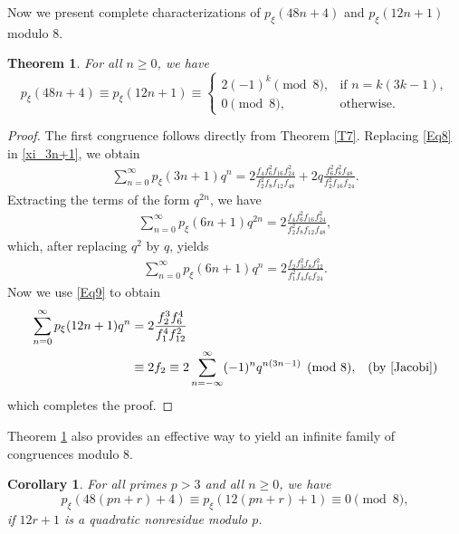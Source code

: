 \documentclass[12pt]{article}
\newtheorem{theorem}{Theorem}[section]
\newtheorem{corollary}{Corollary}[section]
\begin{document}
	Now we present complete characterizations of $p_{\xi}(48n+4)$ and $p_{\xi}(12n+1)$ modulo 8.
	
	\begin{theorem} For all $n \geq 0$, we have 
		$$p_{\xi}(48n+4) \equiv p_{\xi}(12n+1) \equiv  
		\begin{cases}
		2(-1)^k \pmod{8}, & \mbox{if $n=k(3k-1)$}, \\
		0 \pmod{8}, & \mbox{otherwise}.
		\end{cases}$$
	\label{T8}
	\end{theorem}
	
	\begin{proof}
		The first congruence follows directly from Theorem \ref{T7}. Replacing \eqref{Eq8} in \eqref{xi_3n+1}, we obtain
		\begin{align*}
		\sum_{n=0}^{\infty} p_{\xi}(3n+1)q^n = 2\displaystyle\frac{f_{4}f_{6}^2f_{16}f_{24}^{2}}{f_{2}^{2}f_{8}f_{12}f_{48}} + 2q\displaystyle\frac{f_{6}^2f_{8}^{2}f_{48}}{f_{2}^{2}f_{16}f_{24}}.
		\end{align*}
		Extracting the terms of the form $q^{2n}$, we have
		\begin{align*}
		\sum_{n=0}^{\infty} p_{\xi}(6n+1)q^{2n} = 2\displaystyle\frac{f_{4}f_{6}^2f_{16}f_{24}^{2}}{f_{2}^{2}f_{8}f_{12}f_{48}},
		\end{align*}
		which, after replacing $q^2$ by $q$, yields
		\begin{align}
		\sum_{n=0}^{\infty} p_{\xi}(6n+1)q^{n} = 2\displaystyle\frac{f_{2}f_{3}^2f_{8}f_{12}^{2}}{f_{1}^{2}f_{4}f_{6}f_{24}}.
		\label{Eq28}
		\end{align}
		Now we use \eqref{Eq9} to obtain
		\begin{align*}
		\sum_{n=0}^{\infty} p_{\xi}(12n+1)q^{n} & = 2\displaystyle\frac{f_{2}^3f_{6}^4}{f_{1}^4f_{12}^2} &  \\
		& \equiv 2f_2  \equiv 2 \sum_{n=-\infty}^{\infty} (-1)^n q^{n(3n-1)} \pmod{8}, & (\mbox{by \eqref{Jacobi}})
		\end{align*}
		which completes the proof.
	\end{proof}

Theorem \ref{T8} also provides an effective way to yield an infinite family of congruences modulo $8$.
	
		\begin{corollary} For all primes $p > 3$ and all $n\geq 0$, we have
		$$p_{\xi}(48(pn+r)+4) \equiv p_{\xi}(12(pn+r)+1) \equiv 0 \pmod{8},$$
		if $12r+1$ is a quadratic nonresidue modulo $p$.
	\end{corollary}	
\end{document}
